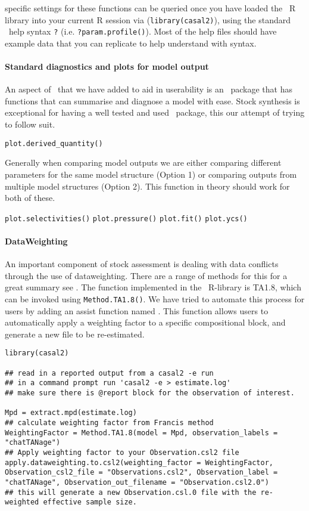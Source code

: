 specific settings for these functions can be queried once you have loaded the \CNAME\ R library into your current R session via (\texttt{library(casal2)}), using the standard \R\ help syntax \texttt{?} (i.e. \texttt{?param.profile()}). Most of the help files should have example data that you can replicate to help understand with syntax.
\\
\paragraph*{Standard diagnostics and plots for model output}
An aspect of \CNAME\ that we have added to aid in userability is an \R\ package that has functions that can summarise and diagnose a model with ease. Stock synthesis is exceptional for having a well tested and used \R\ package, this our attempt of trying to follow suit.

\texttt{plot.derived\_quantity()}


Generally when comparing model outputs we are either comparing different parameters for the same model structure (Option 1) or comparing outputs from multiple model structures (Option 2). This function in theory should work for both of these.

\texttt{plot.selectivities()}
\texttt{plot.pressure()}
\texttt{plot.fit()}
\texttt{plot.ycs()}

\paragraph*{DataWeighting}
An important component of stock assessment is dealing with data conflicts through the use of dataweighting. There are a range of methods for this for a great summary see \cite{francis2011data}. The function implemented in the \CNAME\ R-library is TA1.8, which can be invoked using \texttt{Method.TA1.8()}. We have tried to automate this process for users by adding an assist function named . This function allows users to automatically apply a weighting factor to a specific compositional  block, and generate a new  file to be re-estimated.

\begin{lstlisting}
library(casal2)

## read in a reported output from a casal2 -e run
## in a command prompt run 'casal2 -e > estimate.log'
## make sure there is @report block for the observation of interest.

Mpd = extract.mpd(estimate.log)
## calculate weighting factor from Francis method
WeightingFactor = Method.TA1.8(model = Mpd, observation_labels = "chatTANage")
## Apply weighting factor to your Observation.csl2 file
apply.dataweighting.to.csl2(weighting_factor = WeightingFactor, Observation_csl2_file = "Observations.csl2", Observation_label = "chatTANage", Observation_out_filename = "Observation.csl2.0")
## this will generate a new Observation.csl.0 file with the re-weighted effective sample size.
\end{lstlisting}


